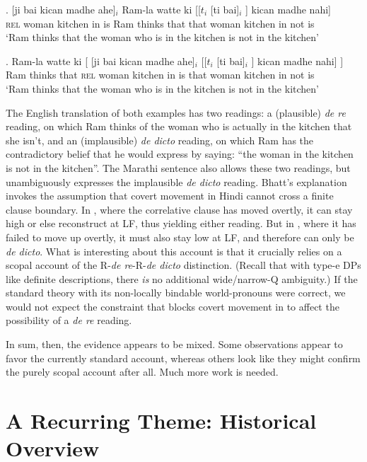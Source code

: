 \exg. [ji bai kican madhe ahe]$_{i}$ Ram-la watte ki [[$t_{i}$ [ti bai]$_{i}$ ] kican madhe nahi]\\
\textsc{rel} woman kitchen in is Ram thinks that that woman kitchen in not is\\
`Ram thinks that the woman who is in the kitchen is not in the kitchen'

\ex. Ram-la watte ki [ [ji bai kican madhe ahe]$_{i}$ [[$t_{i}$ [ti bai]$_{i}$ ] kican madhe nahi] ]\\
Ram thinks that \textsc{rel} woman kitchen in is that woman kitchen in not is\\
`Ram thinks that the woman who is in the kitchen is not in the kitchen'

The English translation of both examples has two readings: a (plausible) \emph{de re} reading, on which Ram thinks of the woman who is actually in the kitchen that she isn't, and an (implausible) \emph{de dicto} reading, on which Ram has the contradictory belief that he would express by saying: ``the woman in the kitchen is not in the kitchen''. The Marathi sentence \LLast also allows these two readings, but \Last unambiguously expresses the implausible \emph{de dicto} reading. Bhatt's explanation invokes the assumption that covert movement in Hindi cannot cross a finite clause boundary. In \LLast, where the correlative clause has moved overtly, it can stay high or else reconstruct at LF, thus yielding either reading. But in \Last, where it has failed to move up overtly, it must also stay low at LF, and therefore can only be \emph{de dicto}. What is interesting about this account is that it crucially relies on a scopal account of the R-\emph{de re}-R-\emph{de dicto} distinction. (Recall that with type-e DPs like definite descriptions, there \emph{is} no additional wide/narrow-Q ambiguity.) If the standard theory with its non-locally bindable world-pronouns were correct, we would not expect the constraint that blocks covert movement in \Last to affect the possibility of a \emph{de re} reading.

In sum, then, the evidence appears to be mixed. Some observations appear to favor the currently standard account, whereas others look like they might confirm the purely scopal account after all. Much more work is needed.

\section{A Recurring Theme: Historical Overview}

